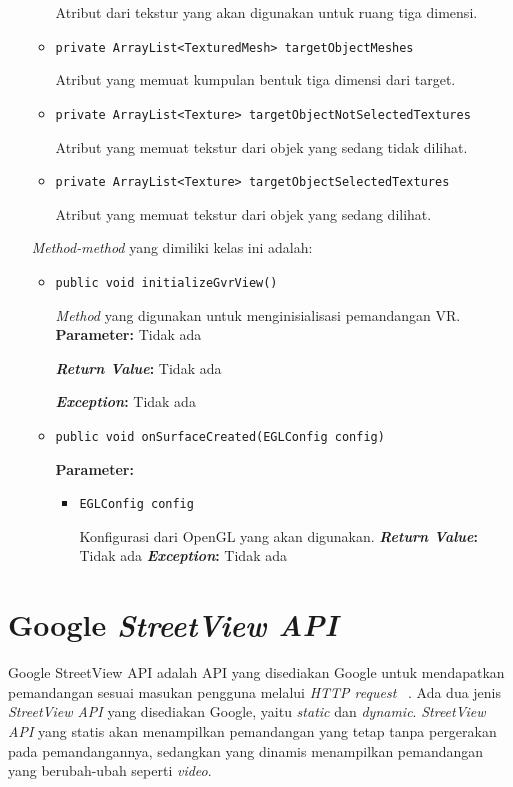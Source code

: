 \begin{enumerate}
\begin{itemize}
  		Atribut dari tekstur yang akan digunakan untuk ruang tiga dimensi.
  		\item \texttt{private ArrayList<TexturedMesh> targetObjectMeshes}
  		
  		Atribut yang memuat kumpulan bentuk tiga dimensi dari target.
  		\item \texttt{private ArrayList<Texture> targetObjectNotSelectedTextures}
  		
  		
  		Atribut yang memuat tekstur dari objek yang sedang tidak dilihat.
  		\item \texttt{private ArrayList<Texture> targetObjectSelectedTextures}
  		
  		Atribut yang memuat tekstur dari objek yang sedang dilihat.
	\end{itemize}
	
	\textit{Method-method} yang dimiliki kelas ini adalah:
	
	\begin{itemize}
		\item \texttt{public void initializeGvrView()}
		
		\textit{Method} yang digunakan untuk menginisialisasi pemandangan VR.
		\textbf{Parameter:} Tidak ada
		
		\textbf{\textit{Return Value}:} Tidak ada
		
		\textbf{\textit{Exception}:} Tidak ada		
		
		\item \texttt{public void onSurfaceCreated(EGLConfig config)}
		
		\textbf{Parameter:}
			\begin{itemize}
			\item \texttt{EGLConfig config}
			
		Konfigurasi dari OpenGL yang akan digunakan.
		\textbf{\textit{Return Value}:} Tidak ada
		\textbf{\textit{Exception}:} Tidak ada		
					
			
			\end{itemize}					

	\end{itemize}
	
\end{enumerate}

\section{Google \it{StreetView API}}
\label{sec:streetview}
Google StreetView API adalah API yang disediakan Google untuk mendapatkan pemandangan sesuai masukan pengguna melalui \textit{HTTP request} ~\cite{streetview-api}. Ada dua jenis {\it StreetView API} yang disediakan Google, yaitu {\it static} dan {\it dynamic}. {\it StreetView API} yang statis akan menampilkan pemandangan yang tetap tanpa pergerakan pada pemandangannya, sedangkan yang dinamis menampilkan pemandangan yang berubah-ubah seperti {\it video}.

